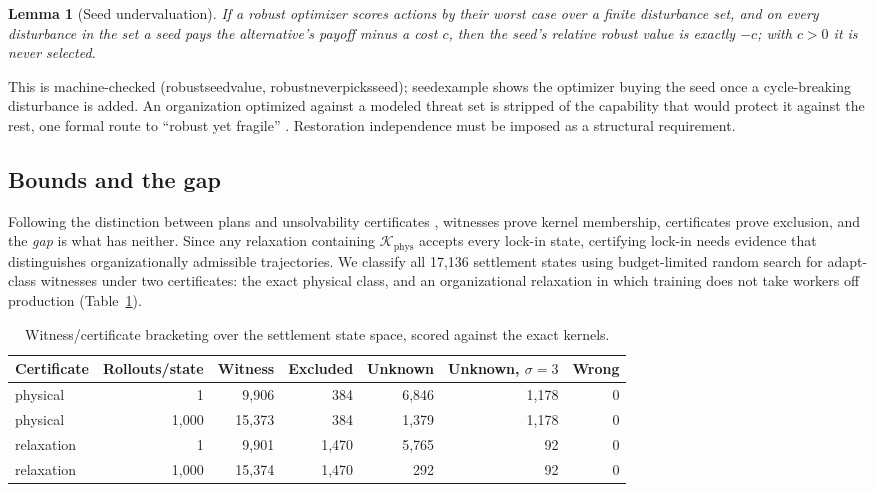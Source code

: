 \documentclass[11pt]{article}
\theoremstyle{plain}
\newtheorem{lemma}[theorem]{Lemma}
\theoremstyle{definition}
\newcommand{\K}{\mathcal{K}}
\newcommand{\phys}{\mathrm{phys}}
\newcommand{\lean}[1]{{\ttfamily\renewcommand{\_}{\textunderscore\allowbreak}#1}}
\begin{document}
\begin{lemma}[Seed undervaluation]\label{lem:seed}
If a robust optimizer scores actions by their worst case over a finite disturbance set, and on every disturbance in the set a seed pays the alternative's payoff minus a cost $c$, then the seed's relative robust value is exactly $-c$; with $c>0$ it is never selected.
\end{lemma}

This is machine-checked (\lean{robust\_seed\_value}, \lean{robust\_never\_picks\_seed}); \lean{seed\_example} shows the optimizer buying the seed once a cycle-breaking disturbance is added. An organization optimized against a modeled threat set is stripped of the capability that would protect it against the rest, one formal route to ``robust yet fragile'' \citep{CarlsonDoyle2002}. Restoration independence must be imposed as a structural requirement.

\subsection{Bounds and the gap}

Following the distinction between plans and unsolvability certificates \citep[Definitions~1--2]{ErikssonEtAl2017}, witnesses prove kernel membership, certificates prove exclusion, and the \emph{gap} is what has neither. Since any relaxation containing $\K_\phys$ accepts every lock-in state, certifying lock-in needs evidence that distinguishes organizationally admissible trajectories. We classify all 17,136 settlement states using budget-limited random search for adapt-class witnesses under two certificates: the exact physical class, and an organizational relaxation in which training does not take workers off production (Table~\ref{tab:gap}).

\begin{table}[t]
\centering\small
\caption{Witness/certificate bracketing over the settlement state space, scored against the exact kernels.}
\label{tab:gap}
\begin{tabular}{@{}lrrrrrr@{}}
\toprule
Certificate & Rollouts/state & Witness & Excluded & Unknown & Unknown, $\sigma=3$ & Wrong \\
\midrule
physical & 1 & 9,906 & 384 & 6,846 & 1,178 & 0 \\
physical & 1,000 & 15,373 & 384 & 1,379 & 1,178 & 0 \\
relaxation & 1 & 9,901 & 1,470 & 5,765 & 92 & 0 \\
relaxation & 1,000 & 15,374 & 1,470 & 292 & 92 & 0 \\
\bottomrule
\end{tabular}
\end{table}
\end{document}
